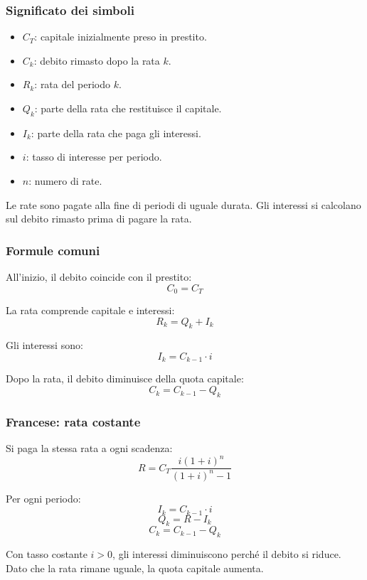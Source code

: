 \subsubsection*{Significato dei simboli}

\begin{itemize}
    \item $C_T$: capitale inizialmente preso in prestito.
    \item $C_k$: debito rimasto dopo la rata $k$.
    \item $R_k$: rata del periodo $k$.
    \item $Q_k$: parte della rata che restituisce il capitale.
    \item $I_k$: parte della rata che paga gli interessi.
    \item $i$: tasso di interesse per periodo.
    \item $n$: numero di rate.
\end{itemize}

\noindent
Le rate sono pagate alla fine di periodi di uguale durata.
Gli interessi si calcolano sul debito rimasto
prima di pagare la rata.

\subsubsection*{Formule comuni}

\noindent
All'inizio, il debito coincide con il prestito:
\[
    C_0=C_T
\]

\noindent
La rata comprende capitale e interessi:
\[
    R_k=Q_k+I_k
\]

\noindent
Gli interessi sono:
\[
    I_k=C_{k-1}\cdot i
\]

\noindent
Dopo la rata, il debito diminuisce della quota capitale:
\[
    C_k=C_{k-1}-Q_k
\]

\subsubsection*{Francese: rata costante}

\noindent
Si paga la stessa rata a ogni scadenza:
\[
    R=C_T\frac{i(1+i)^n}{(1+i)^n-1}
\]

\noindent
Per ogni periodo:
\[
    I_k=C_{k-1}\cdot i
\]
\[
    Q_k=R-I_k
\]
\[
    C_k=C_{k-1}-Q_k
\]

\noindent
Con tasso costante $i>0$, gli interessi diminuiscono
perché il debito si riduce.
Dato che la rata rimane uguale, la quota capitale aumenta.

